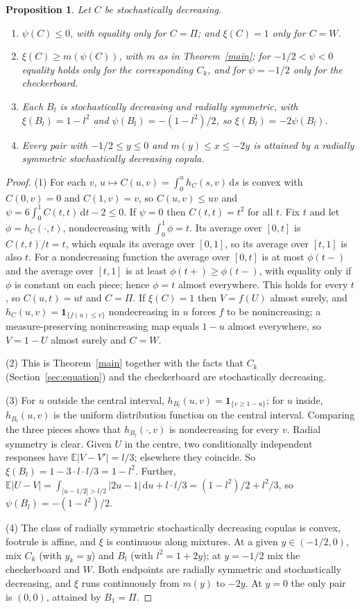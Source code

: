 \documentclass[11pt,a4paper]{article}
\newtheorem{proposition}[theorem]{Proposition}
\theoremstyle{remark}
\newcommand{\E}{\mathbb E}
\newcommand{\1}{\mathbf 1}
\newcommand{\dd}{\,\mathrm d}
\begin{document}
\begin{proposition}\label{sdregion}
Let $C$ be stochastically decreasing.
\begin{enumerate}
\item $\psi(C)\le0$, with equality only for $C=\Pi$; and $\xi(C)=1$ only for $C=W$.
\item $\xi(C)\ge m(\psi(C))$, with $m$ as in Theorem~\ref{main}; for $-1/2<\psi<0$ equality holds only for the corresponding $C_k$, and for $\psi=-1/2$ only for the checkerboard.
\item Each $B_l$ is stochastically decreasing and radially symmetric, with $\xi(B_l)=1-l^2$ and $\psi(B_l)=-(1-l^2)/2$, so $\xi(B_l)=-2\psi(B_l)$.
\item Every pair with $-1/2\le y\le0$ and $m(y)\le x\le-2y$ is attained by a radially symmetric stochastically decreasing copula.
\end{enumerate}
\end{proposition}
\begin{proof}
(1) For each $v$, $u\mapsto C(u,v)=\int_0^uh_C(s,v)\dd s$ is convex with $C(0,v)=0$ and $C(1,v)=v$, so $C(u,v)\le uv$ and $\psi=6\int_0^1C(t,t)\dd t-2\le0$. If $\psi=0$ then $C(t,t)=t^2$ for all $t$. Fix $t$ and let $\phi=h_C(\cdot,t)$, nondecreasing with $\int_0^1\phi=t$. Its average over $[0,t]$ is $C(t,t)/t=t$, which equals its average over $[0,1]$, so its average over $[t,1]$ is also $t$. For a nondecreasing function the average over $[0,t]$ is at most $\phi(t-)$ and the average over $[t,1]$ is at least $\phi(t+)\ge\phi(t-)$, with equality only if $\phi$ is constant on each piece; hence $\phi=t$ almost everywhere. This holds for every $t$, so $C(u,t)=ut$ and $C=\Pi$. If $\xi(C)=1$ then $V=f(U)$ almost surely, and $h_C(u,v)=\1_{\{f(u)\le v\}}$ nondecreasing in $u$ forces $f$ to be nonincreasing; a measure-preserving nonincreasing map equals $1-u$ almost everywhere, so $V=1-U$ almost surely and $C=W$.

(2) This is Theorem~\ref{main} together with the facts that $C_k$ (Section~\ref{sec:equation}) and the checkerboard are stochastically decreasing.

(3) For $u$ outside the central interval, $h_{B_l}(u,v)=\1_{\{v\ge1-u\}}$; for $u$ inside, $h_{B_l}(u,v)$ is the uniform distribution function on the central interval. Comparing the three pieces shows that $h_{B_l}(\cdot,v)$ is nondecreasing for every $v$. Radial symmetry is clear. Given $U$ in the centre, two conditionally independent responses have $\E|V-V'|=l/3$; elsewhere they coincide. So $\xi(B_l)=1-3\cdot l\cdot l/3=1-l^2$. Further, $\E|U-V|=\int_{|u-1/2|>l/2}|2u-1|\dd u+l\cdot l/3=(1-l^2)/2+l^2/3$, so $\psi(B_l)=-(1-l^2)/2$.

(4) The class of radially symmetric stochastically decreasing copulas is convex, footrule is affine, and $\xi$ is continuous along mixtures. At a given $y\in(-1/2,0)$, mix $C_k$ (with $y_k=y$) and $B_l$ (with $l^2=1+2y$); at $y=-1/2$ mix the checkerboard and $W$. Both endpoints are radially symmetric and stochastically decreasing, and $\xi$ runs continuously from $m(y)$ to $-2y$. At $y=0$ the only pair is $(0,0)$, attained by $B_1=\Pi$.
\end{proof}
\end{document}
